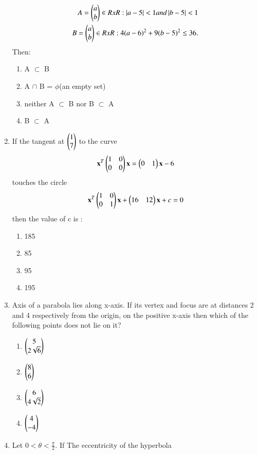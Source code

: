 \begin{enumerate}[label=\arabic*.,ref=\thesubsection.\theenumi]
    \begin{align}
    A = {\begin{pmatrix}a\\b\end{pmatrix}\in R x R: \left\vert a-5\right\vert<1 and \left\vert b-5\right\vert <1}\\
    B = {\begin{pmatrix}a\\b\end{pmatrix}\in R x R:4(a-6)^2+9(b-5)^2\leq 36}.
    \end{align} Then:
    \begin{enumerate}
    \item A $\subset$ B 
    \item A $\cap$ B = $\phi$(an empty set)
    \item neither A $\subset$ B nor B $\subset$ A
    \item B $\subset$ A
    \end{enumerate}
    \item If the tangent at $\begin{pmatrix}1\\7\end{pmatrix}$ to the curve 
    \begin{align}
    \mathbf{x}^T\begin{pmatrix}1&0\\0&0\end{pmatrix}\mathbf{x}=\begin{pmatrix}0&1\end{pmatrix}\mathbf{x}-6
    \end{align} touches the circle 
    \begin{align}
    \mathbf{x}^T\begin{pmatrix}1&0\\0&1\end{pmatrix}\mathbf{x}+\begin{pmatrix}16&12\end{pmatrix}\mathbf{x}+c=0
    \end{align} then the value of c is :
    \begin{enumerate}
    \item 185
    \item 85
    \item 95
    \item 195
    \end{enumerate}
    \item Axis of a parabola lies along x-axis. If its vertex and focus are at distances 2 and 4 respectively from the origin, on the positive x-axis then which of the following points does not lie on it?
    \begin{enumerate}
    \item $\begin{pmatrix}5\\2\sqrt{6}\end{pmatrix}$
    \item $\begin{pmatrix}8\\6\end{pmatrix}$
    \item $\begin{pmatrix}6\\4\sqrt{2}\end{pmatrix}$
    \item $\begin{pmatrix}4\\-4\end{pmatrix}$
    \end{enumerate}
    \item Let $0<\theta<\frac{\pi}{2}$. If The eccentricity of the hyperbola

\end{enumerate}
